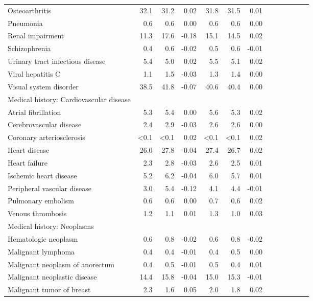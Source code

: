 \documentclass[11pt,]{article}
\begin{document}
\begin{longtable}{lrrrrrrrrrrrr}
      Osteoarthritis & 32.1 & 31.2 &  0.02 & 31.8 & 31.5 &  0.01 \\ 
      Pneumonia &  0.6 &  0.6 &  0.00 &  0.6 &  0.6 &  0.00 \\ 
      Renal impairment & 11.3 & 17.6 & -0.18 & 15.1 & 14.5 &  0.02 \\ 
      Schizophrenia &  0.4 &  0.6 & -0.02 &  0.5 &  0.6 & -0.01 \\ 
      Urinary tract infectious disease &  5.4 &  5.0 &  0.02 &  5.5 &  5.1 &  0.02 \\ 
      Viral hepatitis C &  1.1 &  1.5 & -0.03 &  1.3 &  1.4 &  0.00 \\ 
      Visual system disorder & 38.5 & 41.8 & -0.07 & 40.6 & 40.4 &  0.00 \\ 
  Medical history: Cardiovascular disease &    &    &     &    &    &     \\ 
      Atrial fibrillation &  5.3 &  5.4 &  0.00 &  5.6 &  5.3 &  0.02 \\ 
      Cerebrovascular disease &  2.4 &  2.9 & -0.03 &  2.6 &  2.6 &  0.00 \\ 
      Coronary arteriosclerosis & <0.1 & <0.1 &  0.02 & <0.1 & <0.1 &  0.02 \\ 
      Heart disease & 26.0 & 27.8 & -0.04 & 27.4 & 26.7 &  0.02 \\ 
      Heart failure &  2.3 &  2.8 & -0.03 &  2.6 &  2.5 &  0.01 \\ 
      Ischemic heart disease &  5.2 &  6.2 & -0.04 &  6.0 &  5.7 &  0.01 \\ 
      Peripheral vascular disease &  3.0 &  5.4 & -0.12 &  4.1 &  4.4 & -0.01 \\ 
      Pulmonary embolism &  0.6 &  0.6 &  0.00 &  0.7 &  0.6 &  0.02 \\ 
      Venous thrombosis &  1.2 &  1.1 &  0.01 &  1.3 &  1.0 &  0.03 \\ 
  Medical history: Neoplasms &    &    &     &    &    &     \\ 
      Hematologic neoplasm &  0.6 &  0.8 & -0.02 &  0.6 &  0.8 & -0.02 \\ 
      Malignant lymphoma &  0.4 &  0.4 & -0.01 &  0.4 &  0.5 &  0.00 \\ 
      Malignant neoplasm of anorectum &  0.4 &  0.5 & -0.01 &  0.5 &  0.4 &  0.01 \\ 
      Malignant neoplastic disease & 14.4 & 15.8 & -0.04 & 15.0 & 15.3 & -0.01 \\ 
      Malignant tumor of breast &  2.3 &  1.6 &  0.05 &  2.0 &  1.8 &  0.02 \\ 

\end{longtable}
\end{document}
